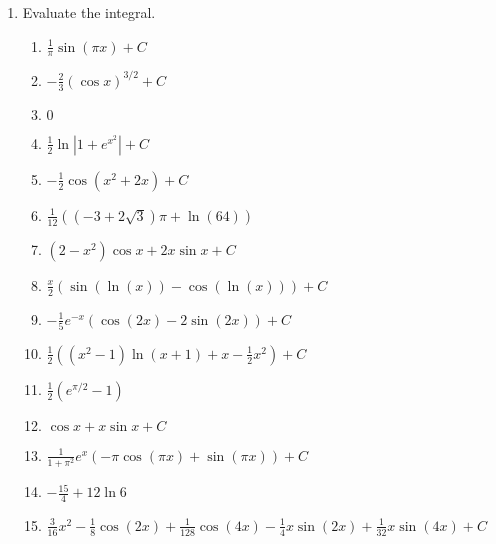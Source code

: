 \documentclass[letterpaper]{article}
\begin{document}
\begin{enumerate}

\item Evaluate the integral.
	\begin{enumerate}

	\item $\frac1\pi \sin(\pi x) +C$

	\item $-\frac23 (\cos x)^{3/2}+C$

	\item $0$

	\item $\frac12 \ln\left|1+e^{x^2}\right|+C$

	\item $-\frac12 \cos(x^2+2x)+C$

	\item $\frac{1}{12} \left(\left(-3+2 \sqrt{3}\right) \pi +\ln(64)\right)$

	\item $(2-x^2)\cos x + 2x\sin x +C$

	\item $\frac x2 \left(\sin(\ln(x))-\cos(\ln(x))\right)+C$

	\item $-\frac15 e^{-x}(\cos (2x)-2\sin(2x))+C$

	\item $\frac12 ((x^2-1)\ln (x+1) +x-\frac12 x^2)+C$

	\item $\frac12 (e^{\pi/2}-1)$

	\item $\cos x + x\sin x +C$

	\item $\frac1{1+\pi^2} e^x(-\pi \cos(\pi x)+\sin(\pi x))+C$

	\item $-\frac{15}4+12\ln 6$

	\item $\frac{3}{16}x^2-\frac{1}{8} \cos(2 x)+\frac{1}{128} \cos(4 x)-\frac{1}{4} x \sin(2 x)+\frac{1}{32} x \sin(4 x)+C$


\end{enumerate}
\end{enumerate}
\end{document}
